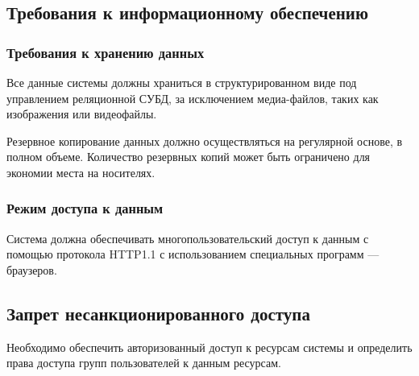 \subsection{Требования к информационному обеспечению}


\subsubsection{Требования к хранению данных}
Все данные системы должны храниться в структурированном виде под управлением реляционной СУБД, за исключением медиа-файлов, таких как изображения или видеофайлы.

Резервное копирование данных должно осуществляться на регулярной основе, в полном объеме. Количество резервных копий может быть ограничено для экономии места на носителях.


\subsubsection{Режим доступа к данным}

Система должна обеспечивать многопользовательский доступ к данным с помощью протокола HTTP1.1 с использованием специальных программ --- браузеров.


\subsection{Запрет несанкционированного доступа}

Необходимо обеспечить авторизованный доступ к ресурсам системы и определить права доступа групп пользователей к данным ресурсам.
